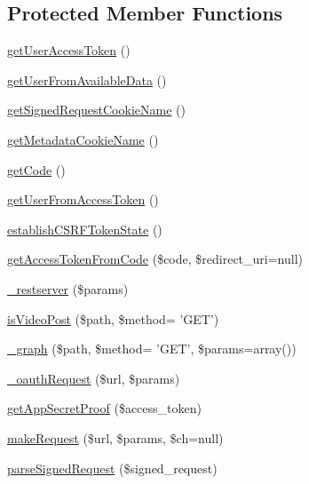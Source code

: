 \subsection*{Protected Member Functions}
\begin{DoxyCompactItemize}
\item 
\hyperlink{class_base_facebook_a13460ccc9f833e624e11f1988ccf9923}{get\-User\-Access\-Token} ()
\item 
\hyperlink{class_base_facebook_a0cf00b33e34f3d1288963a0270bbe4b9}{get\-User\-From\-Available\-Data} ()
\item 
\hyperlink{class_base_facebook_a699dd8edd336c54bb1b9485dafbf6c09}{get\-Signed\-Request\-Cookie\-Name} ()
\item 
\hyperlink{class_base_facebook_a8fb683d23c5113224c419561deef2d0f}{get\-Metadata\-Cookie\-Name} ()
\item 
\hyperlink{class_base_facebook_ab5e24da53b4a0d0848b18c1e832f47ff}{get\-Code} ()
\item 
\hyperlink{class_base_facebook_abb0066c65d21263162826abb97fabff9}{get\-User\-From\-Access\-Token} ()
\item 
\hyperlink{class_base_facebook_a579528d3b5dd4a53d0c83c9de50858e1}{establish\-C\-S\-R\-F\-Token\-State} ()
\item 
\hyperlink{class_base_facebook_a27cada549277075995ed72db33418599}{get\-Access\-Token\-From\-Code} (\$code, \$redirect\-\_\-uri=null)
\item 
\hyperlink{class_base_facebook_a6285ac6151ea12fe9ebb5cb5df729db4}{\-\_\-restserver} (\$params)
\item 
\hyperlink{class_base_facebook_ad7c548c378305526cdfa055be95ee879}{is\-Video\-Post} (\$path, \$method= 'G\-E\-T')
\item 
\hyperlink{class_base_facebook_a4344aefe9fb93fcbad8db2d7f9d7b2e8}{\-\_\-graph} (\$path, \$method= 'G\-E\-T', \$params=array())
\item 
\hyperlink{class_base_facebook_a1e520893c45507103d5722f6e98b5855}{\-\_\-oauth\-Request} (\$url, \$params)
\item 
\hyperlink{class_base_facebook_a13da888ee4b662a9efd04dd2f32be0e8}{get\-App\-Secret\-Proof} (\$access\-\_\-token)
\item 
\hyperlink{class_base_facebook_a43349b0f9d884f1357591ab9683ea651}{make\-Request} (\$url, \$params, \$ch=null)
\item 
\hyperlink{class_base_facebook_abd774acd4ace03e468a034d83e88416a}{parse\-Signed\-Request} (\$signed\-\_\-request)
\item 

\end{DoxyCompactItemize}
